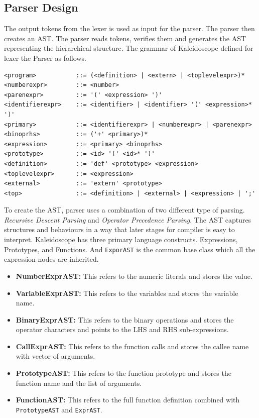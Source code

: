 \documentclass[acmlarge, nonacm]{acmart}
\begin{document}
\subsection{Parser Design}
The output tokens from the lexer is used as input for  the parser. The parser then creates an AST. The parser reads tokens, verifies them and generates the AST representing the hierarchical structure. The grammar of Kaleidoscope defined for lexer the Parser as follows.
\begin{lstlisting}
<program>           ::= (<definition> | <extern> | <toplevelexpr>)*
<numberexpr>        ::= <number>
<parenexpr>         ::= '(' <expression> ')'
<identifierexpr>    ::= <identifier> | <identifier> '(' <expression>* ')'
<primary>           ::= <identifierexpr> | <numberexpr> | <parenexpr>
<binoprhs>          ::= ('+' <primary>)*
<expression>        ::= <primary> <binoprhs>
<prototype>         ::= <id> '(' <id>* ')'
<definition>        ::= 'def' <prototype> <expression>
<toplevelexpr>      ::= <expression>
<external>          ::= 'extern' <prototype>
<top>               ::= <definition> | <external> | <expression> | ';'
\end{lstlisting}

To create the AST, parser uses a combination of two different type of parsing. \textit{Recursive Descent Parsing} and \textit{Operator Precedence Parsing}. The AST captures structures and behaviours in a way that later stages for compiler is easy to interpret. Kaleidoscope has three primary language constructs. Expressions, Prototypes, and Functions. And \verb|ExporAST| is the common base class which all the expression nodes are inherited.
\begin{itemize}
\item{\textbf{NumberExprAST:}} This refers to the numeric literals and stores the value.
\item{\textbf{VariableExprAST:}} This refers to the variables and stores the variable name.
\item{\textbf{BinaryExprAST:}} This refers to the binary operations and stores the operator characters and points to the LHS and RHS sub-expressions.
\item{\textbf{CallExprAST:}} This refers to the function calls and stores the callee name with vector of arguments.
\item{\textbf{PrototypeAST:}} This refers to the function prototype and stores the function name and the list of arguments.
\item{\textbf{FunctionAST:}} This refers to the full function definition combined with \verb|PrototypeAST| and \verb|ExprAST|.
\end{itemize}
\end{document}
